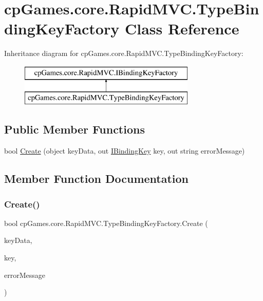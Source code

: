 \hypertarget{classcp_games_1_1core_1_1_rapid_m_v_c_1_1_type_binding_key_factory}{}\section{cp\+Games.\+core.\+Rapid\+M\+V\+C.\+Type\+Binding\+Key\+Factory Class Reference}
\label{classcp_games_1_1core_1_1_rapid_m_v_c_1_1_type_binding_key_factory}
Inheritance diagram for cp\+Games.\+core.\+Rapid\+M\+V\+C.\+Type\+Binding\+Key\+Factory\+:\begin{figure}[H]
\begin{center}
\leavevmode
\includegraphics[height=2.000000cm]{classcp_games_1_1core_1_1_rapid_m_v_c_1_1_type_binding_key_factory}
\end{center}
\end{figure}
\subsection*{Public Member Functions}
\begin{DoxyCompactItemize}
\item 
bool \mbox{\hyperlink{classcp_games_1_1core_1_1_rapid_m_v_c_1_1_type_binding_key_factory_ab895639911e562ea6bbb1141911496af}{Create}} (object key\+Data, out \mbox{\hyperlink{interfacecp_games_1_1core_1_1_rapid_m_v_c_1_1_i_binding_key}{I\+Binding\+Key}} key, out string error\+Message)
\end{DoxyCompactItemize}


\subsection{Member Function Documentation}
\mbox{\label{classcp_games_1_1core_1_1_rapid_m_v_c_1_1_type_binding_key_factory_ab895639911e562ea6bbb1141911496af}} 
\subsubsection{\texorpdfstring{Create()}{Create()}}
{\footnotesize\ttfamily bool cp\+Games.\+core.\+Rapid\+M\+V\+C.\+Type\+Binding\+Key\+Factory.\+Create (\begin{DoxyParamCaption}\item[{object}]{key\+Data,  }\item[{out \mbox{\hyperlink{interfacecp_games_1_1core_1_1_rapid_m_v_c_1_1_i_binding_key}{I\+Binding\+Key}}}]{key,  }\item[{out string}]{error\+Message }\end{DoxyParamCaption})}



